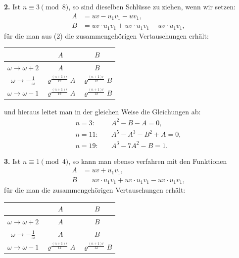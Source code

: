 \documentclass[12pt,a4paper]{article}
\theoremstyle{definition}
\begin{document}
\textbf{2.} Ist $n \equiv 3 \pmod{8}$, so sind dieselben Schlüsse zu ziehen, wenn wir setzen:
\begin{equation}\label{eq:75-11}
\begin{aligned}
A &= uv - u_1v_1 - uv_1, \\
B &= uv \cdot u_1v_1 + uv \cdot u_1v_1 - uv \cdot u_1v_1,
\end{aligned}
\end{equation}
für die man aus (2) die zusammengehörigen Vertauschungen erhält:

\begin{center}
\begin{tabular}{c|cc}
& $A$ & $B$ \\
\midrule
$\omega \to \omega + 2$ & $A$ & $B$ \\
$\omega \to -\frac{1}{\omega}$ & $\varrho^{\frac{(n+1)r}{12}} A$ & $\varrho^{\frac{(n+1)r}{12}} B$ \\
$\omega \to \omega - 1$ & $\varrho^{\frac{(n+1)r}{12}} A$ & $\varrho^{\frac{(n+1)r}{12}} B$ \\
\end{tabular}
\end{center}

und hieraus leitet man in der gleichen Weise die Gleichungen ab:
\begin{equation}\label{eq:75-13}
\begin{aligned}
n = 3:\quad &A^2 - B - A = 0, \\
n = 11:\quad &A^5 - A^3 - B^2 + A = 0, \\
n = 19:\quad &A^3 - 7A^2 - B = 1.
\end{aligned}
\end{equation}

\textbf{3.} Ist $n \equiv 1 \pmod{4}$, so kann man ebenso verfahren mit den Funktionen
\begin{equation}\label{eq:75-14}
\begin{aligned}
A &= uv + u_1v_1, \\
B &= uv \cdot u_1v_1 + uv \cdot u_1v_1 - uv \cdot u_1v_1,
\end{aligned}
\end{equation}
für die man die zusammengehörigen Vertauschungen erhält:

\begin{center}
\begin{tabular}{c|cc}
& $A$ & $B$ \\
\midrule
$\omega \to \omega + 2$ & $A$ & $B$ \\
$\omega \to -\frac{1}{\omega}$ & $A$ & $B$ \\
$\omega \to \omega - 1$ & $\varrho^{\frac{(n+1)r}{12}} A$ & $\varrho^{\frac{(n+1)r}{12}} B$ \\
\end{tabular}
\end{center}
\end{document}
